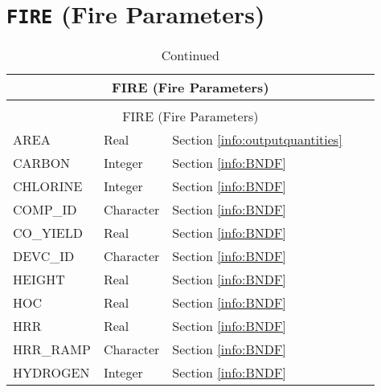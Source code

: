 \vspace{\baselineskip}


\section{\texorpdfstring{{\tt FIRE}}{FIRE} (Fire Parameters)}

\begin{longtable}{@{\extracolsep{\fill}}|l|l|l|l|l|}
\caption[Boundary file parameters ({\ct FIRE} namelist group)]{For more information see Section~\ref{info:BNDF}.}
\label{tbl:FIRE} \\
\hline
\multicolumn{5}{|c|}{{\ct FIRE} (Fire Parameters)} \\
\hline \hline
\endfirsthead
\caption[]{Continued} \\
\hline
\multicolumn{5}{|c|}{{\ct FIRE} (Fire Parameters)} \\
\hline \hline
\endhead
{\ct AREA}          & Real   & Section \ref{info:outputquantities}     &           &                 \\ \hline
{\ct CARBON}        & Integer   & Section \ref{info:BNDF}                 &           &                 \\ \hline
{\ct CHLORINE}        & Integer   & Section \ref{info:BNDF}                 &           &                 \\ \hline
{\ct COMP\_ID}        & Character   & Section \ref{info:BNDF}                 &           &                 \\ \hline
{\ct CO\_YIELD}        & Real   & Section \ref{info:BNDF}                 &           &                 \\ \hline
{\ct DEVC\_ID}        & Character   & Section \ref{info:BNDF}                 &           &                 \\ \hline
{\ct HEIGHT}        & Real   & Section \ref{info:BNDF}                 &           &                 \\ \hline
{\ct HOC}        & Real   & Section \ref{info:BNDF}                 &           &                 \\ \hline
{\ct HRR}        & Real   & Section \ref{info:BNDF}                 &           &                 \\ \hline
{\ct HRR\_RAMP}        & Character   & Section \ref{info:BNDF}                 &           &                 \\ \hline
{\ct HYDROGEN}        & Integer   & Section \ref{info:BNDF}                 &           &                 \\ \hline

\end{longtable}
